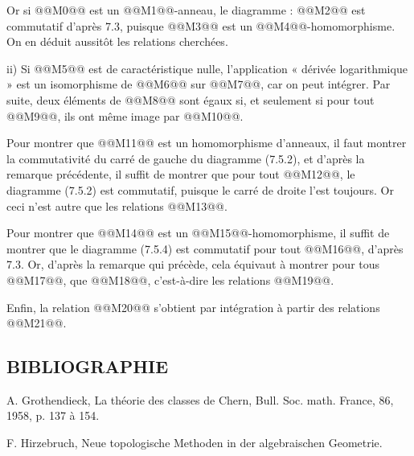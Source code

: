 

Or si @@M0@@ est un @@M1@@-anneau, le diagramme :
@@M2@@
est commutatif d'après 7.3, puisque @@M3@@ est un @@M4@@-homomorphisme. On en déduit aussitôt les relations cherchées.

ii) Si @@M5@@ est de caractéristique nulle, l'application « dérivée logarithmique » est un isomorphisme de @@M6@@ sur @@M7@@, car on peut intégrer. Par suite, deux éléments de @@M8@@ sont égaux si, et seulement si pour tout @@M9@@, ils ont même image par @@M10@@.

Pour montrer que @@M11@@ est un homomorphisme d'anneaux, il faut montrer la commutativité du carré de gauche du diagramme (7.5.2), et d'après la remarque précédente, il suffit de montrer que pour tout @@M12@@, le diagramme (7.5.2) est commutatif, puisque le carré de droite l'est toujours. Or ceci n'est autre que les relations @@M13@@.

Pour montrer que @@M14@@ est un @@M15@@-homomorphisme, il suffit de montrer que le diagramme (7.5.4) est commutatif pour tout @@M16@@, d'après 7.3. Or, d'après la remarque qui précède, cela équivaut à montrer pour tous @@M17@@, que @@M18@@, c'est-à-dire les relations @@M19@@.

Enfin, la relation @@M20@@ s'obtient par intégration à partir des relations @@M21@@.

\subsection*{BIBLIOGRAPHIE}
\begin{enumerate}[label={[\arabic*]}]
\item A. Grothendieck, La théorie des classes de Chern, Bull. Soc. math. France, 86, 1958, p. 137 à 154.
\item F. Hirzebruch, Neue topologische Methoden in der algebraischen Geometrie.
\end{enumerate}



\providecommand{\Sym}{\operatorname{Sym}}
\providecommand{\Proj}{\operatorname{Proj}}
\providecommand{\Projz}{\operatorname{Proj}_0}
\providecommand{\Spec}{\operatorname{Spec}}
\providecommand{\Comp}{\operatorname{Comp}}
\providecommand{\Dplus}{D_{+}}
\renewcommand{\id}{\operatorname{id}}
\providecommand{\cG}{\mathcal G}
\providecommand{\cA}{\mathcal A}
\providecommand{\cB}{\mathcal B}
\providecommand{\cL}{\mathscr L}
\providecommand{\cM}{\mathscr M}
\providecommand{\cN}{\mathscr N}
\providecommand{\cE}{\mathscr E}
\providecommand{\cK}{\mathscr K}
\providecommand{\cP}{\mathscr P}
\providecommand{\cQ}{\mathscr Q}
\providecommand{\OO}{\mathcal O}
\providecommand{\rk}{\operatorname{rk}}
\providecommand{\colim}{\operatorname*{colim}}



